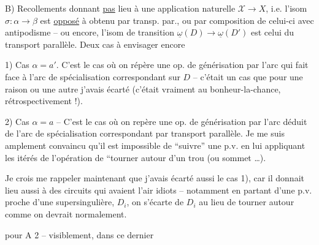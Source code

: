 B) Recollements  donnant \uline{pas} lieu à une application naturelle $\mathscr X\to X$, i.e. l'isom $\sigma:\alpha\to\beta$ est \uline{opposé} à  obtenu par transp. par., ou par composition de celui-ci avec antipodisme -- ou encore, l'isom de transition $\underline{\omega}(D)\to\underline{\omega}(D')$ est  celui du transport parallèle. Deux cas à envisager encore

1) Cas $\alpha=a'$. C'est le cas où on répère une op. de générisation  par l'arc qui fait face à l'arc de spécialisation correspondant sur $D$ -- c'était un cas que pour une raison ou une autre j'avais écarté (c'était vraiment au bonheur-la-chance, rétrospectivement !).

2) Cas $\alpha=a$ -- C'est le cas où on repère une op. de générisation par l'arc  déduit de l'arc de spécialisation correspondant par transport parallèle. Je me suis amplement convaincu qu'il est impossible de ``suivre'' une p.v. en lui appliquant les itérés de l'opération \deleted{\unsure{\ensuremath{\rho}|\ensuremath{\beta}}} de ``tourner autour d'un trou (ou sommet \ldots).

Je crois me rappeler maintenant que j'avais écarté aussi le cas 1), car il donnait lieu aussi à des circuits qui avaient l'air idiots -- notamment en partant d'une p.v. proche d'une supersingulière, $D_i$, on s'écarte de $D_i$ au lieu de tourner autour comme on devrait normalement.

 pour A 2 -- visiblement, dans ce dernier

